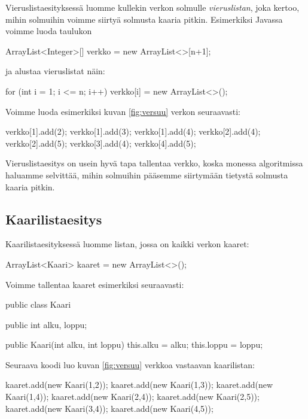 Vieruslistaesityksessä luomme kullekin verkon solmulle
\emph{vieruslistan}, joka kertoo, mihin solmuihin voimme
siirtyä solmusta kaaria pitkin.
Esimerkiksi Javassa voimme luoda taulukon

\begin{code}
ArrayList<Integer>[] verkko = new ArrayList<>[n+1];
\end{code}

ja alustaa vieruslistat näin:

\begin{code}
for (int i = 1; i <= n; i++) {
    verkko[i] = new ArrayList<>();
}
\end{code}

Voimme luoda esimerkiksi kuvan \ref{fig:versuu}
verkon seuraavasti:

\begin{code}
verkko[1].add(2);
verkko[1].add(3);
verkko[1].add(4);
verkko[2].add(4);
verkko[2].add(5);
verkko[3].add(4);
verkko[4].add(5);
\end{code}

Vieruslistaesitys on usein hyvä tapa tallentaa verkko,
koska monessa algoritmissa haluamme selvittää,
mihin solmuihin pääsemme siirtymään tietystä solmusta kaaria pitkin.

\subsection{Kaarilistaesitys}

Kaarilistaesityksessä luomme listan,
jossa on kaikki verkon kaaret:

\begin{code}
ArrayList<Kaari> kaaret = new ArrayList<>();
\end{code}

Voimme tallentaa kaaret esimerkiksi seuraavasti:

\begin{code}
public class Kaari {
    public int alku, loppu;

    public Kaari(int alku, int loppu) {
        this.alku = alku;
        this.loppu = loppu;
    }
}
\end{code}

Seuraava koodi luo kuvan \ref{fig:versuu}
verkkoa vastaavan kaarilistan:

\begin{code}
kaaret.add(new Kaari(1,2));
kaaret.add(new Kaari(1,3));
kaaret.add(new Kaari(1,4));
kaaret.add(new Kaari(2,4));
kaaret.add(new Kaari(2,5));
kaaret.add(new Kaari(3,4));
kaaret.add(new Kaari(4,5));
\end{code}

